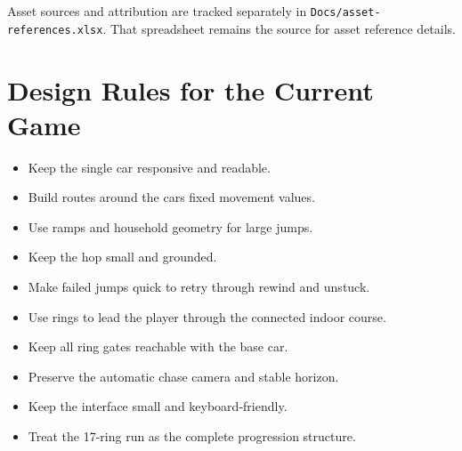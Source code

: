 \documentclass[11pt,a4paper]{article}
\begin{document}
Asset sources and attribution are tracked separately in \texttt{Docs/asset-references.xlsx}. That spreadsheet remains the source for asset reference details.

\section{Design Rules for the Current Game}\label{design-rules-for-the-current-game}

\begin{itemize}
\item
  Keep the single car responsive and readable.
\item
  Build routes around the car\textquotesingle s fixed movement values.
\item
  Use ramps and household geometry for large jumps.
\item
  Keep the hop small and grounded.
\item
  Make failed jumps quick to retry through rewind and unstuck.
\item
  Use rings to lead the player through the connected indoor course.
\item
  Keep all ring gates reachable with the base car.
\item
  Preserve the automatic chase camera and stable horizon.
\item
  Keep the interface small and keyboard-friendly.
\item
  Treat the 17-ring run as the complete progression structure.
\end{itemize}

\clearpage
\renewcommand{\refname}{Assets}
\nocite{*}


\end{document}
